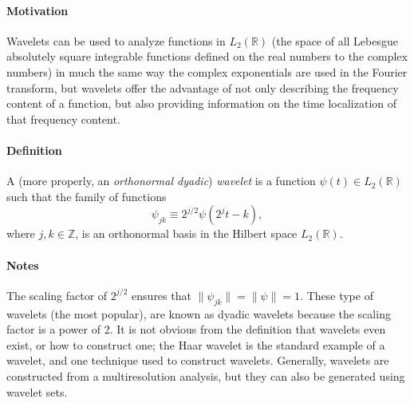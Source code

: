 \documentclass[12pt]{article}
\begin{document}

\paragraph{Motivation}
Wavelets can be used to analyze functions in $L_2({\mathbb R})$ (the space of all Lebesgue absolutely square integrable functions defined on the real numbers to the complex numbers) in much the same way the complex exponentials are used in the Fourier transform, but wavelets offer the advantage of not only describing the frequency content of a function, but also providing information on the time localization of that frequency content.

\paragraph{Definition}
A (more properly, an \emph{orthonormal dyadic}) \emph{wavelet} is a function $\psi(t) \in L_2({\mathbb R})$ such that the family of functions
$$ \psi_{jk} \equiv 2^{j/2} \psi(2^jt - k), $$
where $j,k \in {\mathbb Z}$, is an orthonormal basis in the Hilbert space $L_2({\mathbb R}).$

\paragraph{Notes}
The scaling factor of $2^{j/2}$ ensures that $\| \psi_{jk} \| = \| \psi \| = 1$. These type of wavelets (the most popular), are known as dyadic wavelets because the scaling factor is a power of 2. It is not obvious from the definition that wavelets even exist, or how to construct one; the Haar wavelet is the standard example of a wavelet, and one technique used to construct wavelets. Generally, wavelets are constructed from a multiresolution analysis, but they can also be generated using wavelet sets.
\end{document}
